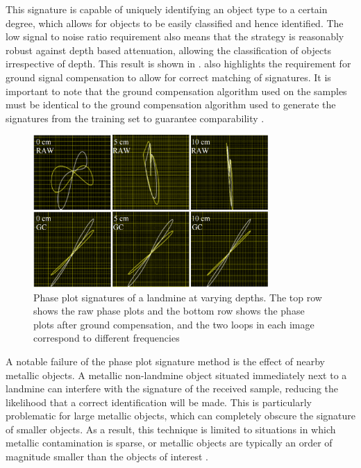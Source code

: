 \documentclass[main.tex]{subfiles}
\begin{document}
This signature is capable of uniquely identifying an object type to a certain degree, which allows for objects to be easily classified and hence identified. The low signal to noise ratio requirement also means that the strategy is reasonably robust against depth based attenuation, allowing the classification of objects irrespective of depth. This result is shown in .  also highlights the requirement for ground signal compensation to allow for correct matching of signatures. It is important to note that the ground compensation algorithm used on the samples must be identical to the ground compensation algorithm used to generate the signatures from the training set to guarantee comparability \parencite{Kruger2006}.
\begin{figure}[ht]
\includegraphics[width=0.8\textwidth]{2-LiteratureReview/compensated-signature.png}
\centering
\caption[Phase plot signatures of a landmine at varying depths]{Phase plot signatures of a landmine at varying depths. The top row shows the raw phase plots and the bottom row shows the phase plots after ground compensation, and the two loops in each image correspond to different frequencies \parencite{Kruger2006}} 
\end{figure}

A notable failure of the phase plot signature method is the effect of nearby metallic objects. A metallic non-landmine object situated immediately next to a landmine can interfere with the signature of the received sample, reducing the likelihood that a correct identification will be made. This is particularly problematic for large metallic objects, which can completely obscure the signature of smaller objects. As a result, this technique is limited to situations in which metallic contamination is sparse, or metallic objects are typically an order of magnitude smaller than the objects of interest \parencite{Kruger2006}.
\end{document}
